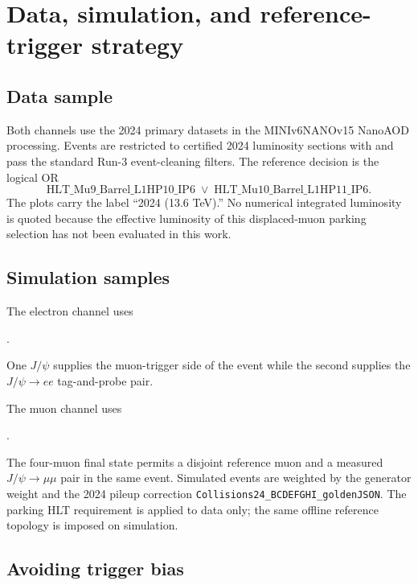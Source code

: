 \documentclass[11pt,a4paper]{article}
\begin{document}
\section{Data, simulation, and reference-trigger strategy}

\subsection{Data sample}

Both channels use the 2024  primary datasets in the MINIv6NANOv15 NanoAOD processing.  Events are restricted to certified 2024 luminosity sections with  and pass the standard Run-3 event-cleaning filters.  The reference decision is the logical OR
\begin{equation}
  \mathrm{HLT\_Mu9\_Barrel\_L1HP10\_IP6}
  \;\lor\;
  \mathrm{HLT\_Mu10\_Barrel\_L1HP11\_IP6}.
\end{equation}
The plots carry the label ``2024 (13.6 TeV).''  No numerical integrated luminosity is quoted because the effective luminosity of this displaced-muon parking selection has not been evaluated in this work.

\subsection{Simulation samples}

The electron channel uses
\begin{center}
\small{}.
\end{center}
One $J/\psi$ supplies the muon-trigger side of the event while the second supplies the $J/\psi\to ee$ tag-and-probe pair.

The muon channel uses
\begin{center}
\small{}.
\end{center}
The four-muon final state permits a disjoint reference muon and a measured $J/\psi\to\mu\mu$ pair in the same event.  Simulated events are weighted by the generator weight and the 2024 pileup correction \texttt{Collisions24\_BCDEFGHI\_goldenJSON}.  The parking HLT requirement is applied to data only; the same offline reference topology is imposed on simulation.

\subsection{Avoiding trigger bias}
\end{document}
